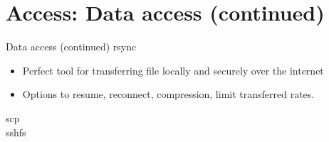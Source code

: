 {
\section{Access: Data access (continued)}
%
\begin{frame}{Data access (continued)}
\text rsync
\begin{itemize}
\item Perfect tool for transferring file locally and securely over the internet
\item Options to resume, reconnect, compression, limit transferred rates.
\end{itemize}
\text scp\\
\text sshfs
\end{frame}
}

